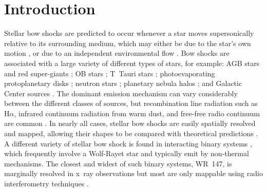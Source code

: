 \documentclass[useAMS, usenatbib, a4paper]{mnras}
\begin{document}
\section{Introduction}
\label{sec:rip-introduction}
Stellar bow shocks are predicted to occur whenever a star moves
supersonically relative to its surrounding medium, which may either be
due to the star's own motion \citetext{runaways, e.g.,
  \citealp{Blaauw:1961a}}, or due to an independent environmental flow
\citetext{weather vanes, e.g., \citealp{Povich:2008a}}.  Bow shocks
are associated with a large variety of different types of stars, for
example: AGB stars and red super-giants \citep{Cox:2012a}; OB stars
\citep{Kobulnicky:2017a}; T~Tauri stars \citep{Gull:1979a,
  Henney:2013a}; photoevaporating protoplanetary disks
\citep{Garcia-Arredondo:2001a, Smith:2005a}; neutron stars
\citep{Cordes:1993a, Brownsberger:2014a}; planetary nebula halos
\citep{Ali:2012a}; and Galactic Center sources \citep{Geballe:2004a,
  Sanchez-Bermudez:2014a}.  The dominant emission mechanism can vary
considerably between the different classes of sources, but
recombination line radiation such as H\(\alpha\), infrared continuum
radiation from warm dust, and free-free radio continuum are common
\citep{Canto:2005a, Acreman:2016a, Meyer:2016a}.  In nearly all cases,
stellar bow shocks are easily spatially resolved and mapped, allowing
their shapes to be compared with theoretical predictions
\citep{Wilkin:1996a, Tarango-Yong:2018a}.  A different variety of
stellar bow shock is found in interacting binary systems
\citep{Stevens:1992a}, which frequently involve a Wolf-Rayet star and
typically emit by non-thermal mechanisms.  The closest and widest of
such binary systems, WR~147, is marginally resolved in x~ray
observations \citep{Pittard:2002a, Zhekov:2010a} but most
are only mappable using radio interferometry techniques
\citep{Contreras:1999a, Dzib:2013a}.
\end{document}
